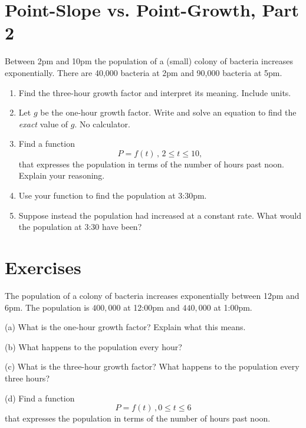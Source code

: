 \documentclass{ximera}
\begin{document}
\section{Point-Slope vs. Point-Growth, Part 2}
\begin{example} \label{Ex578788766}
Between 2pm and 10pm the population of a (small) colony of bacteria increases exponentially. There are 40,000 bacteria at 2pm and 90,000 bacteria at 5pm.

\begin{enumerate}
\item Find the three-hour growth factor and interpret its meaning. Include units.

\item Let $g$ be the one-hour growth factor. Write and solve an equation to find the \emph{exact} value of $g$. No calculator.

\item Find a function 
\[
      P = f(t) \, , \, 2\leq t \leq 10 ,
\]
that expresses the population in terms of the number of hours past noon. Explain your reasoning.

\item Use your function to find the population at 3:30pm.

\item Suppose instead the population had increased at a constant rate. What would the population at 3:30 have been?
\end{enumerate}
\end{example}




\section{Exercises}
\begin{question}   \label{Q4:ExponentialG}
The population of a colony of bacteria increases exponentially between 12pm and 6pm. The population is $400,000$ at 12:00pm and $440,000$ at 1:00pm. 

(a) What is the one-hour growth factor? Explain what this means.

(b) What happens to the population every hour?

(c) What is the three-hour growth factor? What happens to the population every three hours?

(d) Find a function 
\[
     P = f(t) \, , 0\leq t \leq 6 
\]
that expresses the population in terms of the number of hours past noon.

\end{question}
\end{document}
